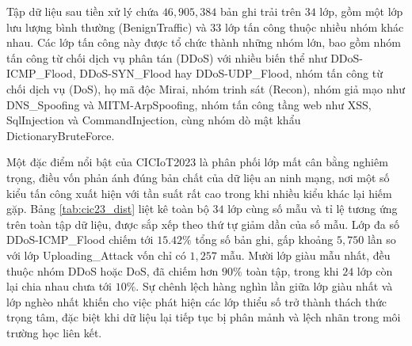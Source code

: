 Tập dữ liệu sau tiền xử lý chứa $46{,}905{,}384$ bản ghi trải trên $34$ lớp, gồm một lớp lưu lượng bình thường (BenignTraffic) và $33$ lớp tấn công thuộc nhiều nhóm khác nhau. Các lớp tấn công này được tổ chức thành những nhóm lớn, bao gồm nhóm tấn công từ chối dịch vụ phân tán (DDoS) với nhiều biến thể như DDoS-ICMP\_Flood, DDoS-SYN\_Flood hay DDoS-UDP\_Flood, nhóm tấn công từ chối dịch vụ (DoS), họ mã độc Mirai, nhóm trinh sát (Recon), nhóm giả mạo như DNS\_Spoofing và MITM-ArpSpoofing, nhóm tấn công tầng web như XSS, SqlInjection và CommandInjection, cùng nhóm dò mật khẩu DictionaryBruteForce.

Một đặc điểm nổi bật của CICIoT2023 là phân phối lớp mất cân bằng nghiêm trọng, điều vốn phản ánh đúng bản chất của dữ liệu an ninh mạng, nơi một số kiểu tấn công xuất hiện với tần suất rất cao trong khi nhiều kiểu khác lại hiếm gặp. Bảng \ref{tab:cic23_dist} liệt kê toàn bộ $34$ lớp cùng số mẫu và tỉ lệ tương ứng trên toàn tập dữ liệu, được sắp xếp theo thứ tự giảm dần của số mẫu. Lớp đa số DDoS-ICMP\_Flood chiếm tới $15.42\%$ tổng số bản ghi, gấp khoảng $5{,}750$ lần so với lớp Uploading\_Attack vốn chỉ có $1{,}257$ mẫu. Mười lớp giàu mẫu nhất, đều thuộc nhóm DDoS hoặc DoS, đã chiếm hơn $90\%$ toàn tập, trong khi $24$ lớp còn lại chia nhau chưa tới $10\%$. Sự chênh lệch hàng nghìn lần giữa lớp giàu nhất và lớp nghèo nhất khiến cho việc phát hiện các lớp thiểu số trở thành thách thức trọng tâm, đặc biệt khi dữ liệu lại tiếp tục bị phân mảnh và lệch nhãn trong môi trường học liên kết.

